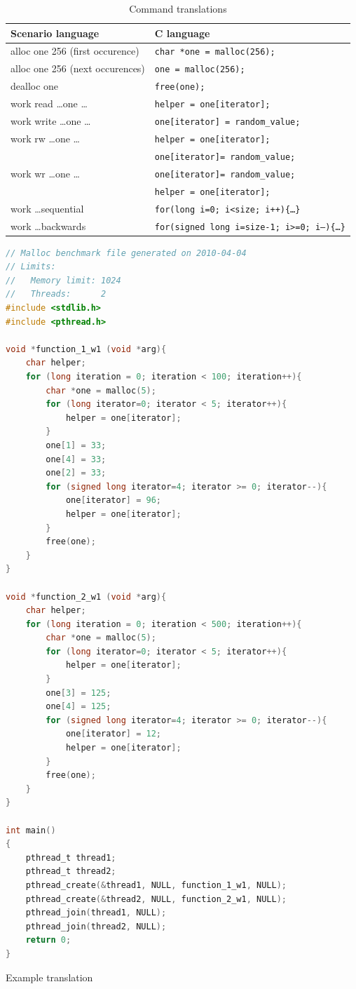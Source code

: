 \begin{table}
\begin{center}
\begin{tabular}{|l|l|}
\hline
Scenario language & C language \\ \hline \hline
alloc one 256 (first occurence) & {\tt char *one = malloc(256);} \\ \hline
alloc one 256 (next occurences) & {\tt one = malloc(256);} \\ \hline
dealloc one & {\tt free(one);} \\ \hline
work read \ldots one \ldots & {\tt helper = one[iterator];} \\ \hline
work write \ldots one \ldots & {\tt one[iterator] = random\_value;} \\ \hline
work rw \ldots one \ldots & {\tt helper = one[iterator];} \\
& {\tt one[iterator]= random\_value;} \\ \hline
work wr \ldots one \ldots & {\tt one[iterator]= random\_value;} \\
& {\tt helper = one[iterator];} \\ \hline
work \ldots sequential & {\tt for(long i=0; i<size; i++)\{\ldots\}} \\ \hline
work \ldots backwards & {\tt for(signed long i=size-1; i>=0; i--)\{\ldots\}} \\
\hline
\end{tabular}
\caption{Command translations}
\label{scen-translate-table}
\end{center}
\end{table}
\begin{table}
\begin{center}
\begin{lstlisting}[frame=single, basicstyle=\tt\footnotesize, language=C]
// Malloc benchmark file generated on 2010-04-04
// Limits:
//   Memory limit: 1024
//   Threads:      2
#include <stdlib.h>
#include <pthread.h>

void *function_1_w1 (void *arg){
	char helper;
	for (long iteration = 0; iteration < 100; iteration++){
		char *one = malloc(5);
		for (long iterator=0; iterator < 5; iterator++){
			helper = one[iterator];
		}
		one[1] = 33;
		one[4] = 33;
		one[2] = 33;
		for (signed long iterator=4; iterator >= 0; iterator--){
			one[iterator] = 96;
			helper = one[iterator];
		}
		free(one);
	}
}

void *function_2_w1 (void *arg){
	char helper;
	for (long iteration = 0; iteration < 500; iteration++){
		char *one = malloc(5);
		for (long iterator=0; iterator < 5; iterator++){
			helper = one[iterator];
		}
		one[3] = 125;
		one[4] = 125;
		for (signed long iterator=4; iterator >= 0; iterator--){
			one[iterator] = 12;
			helper = one[iterator];
		}
		free(one);
	}
}

int main()
{
	pthread_t thread1;
	pthread_t thread2;
	pthread_create(&thread1, NULL, function_1_w1, NULL);
	pthread_create(&thread2, NULL, function_2_w1, NULL);
	pthread_join(thread1, NULL);
	pthread_join(thread2, NULL);
	return 0;
}
\end{lstlisting}
\caption{Example translation}
\label{scenario-sample-trans}
\end{center} 
\end{table}
 
